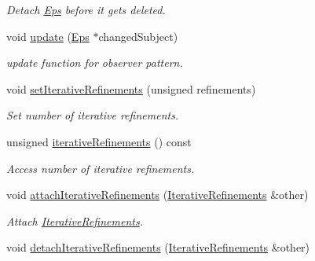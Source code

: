 \begin{DoxyCompactItemize}
\begin{DoxyCompactList}\small\item\em Detach \hyperlink{classSpacy_1_1Mixin_1_1Eps}{Eps} before it gets deleted. \end{DoxyCompactList}\item 
\hypertarget{classSpacy_1_1Mixin_1_1Eps_a151216968daef3da5f5cdc0b957ce01b}{}void \hyperlink{classSpacy_1_1Mixin_1_1Eps_a151216968daef3da5f5cdc0b957ce01b}{update} (\hyperlink{classSpacy_1_1Mixin_1_1Eps_a51dbe0b9cc950e0f3dfd34a481f08ae4_a51dbe0b9cc950e0f3dfd34a481f08ae4}{Eps} $\ast$changed\+Subject)\label{classSpacy_1_1Mixin_1_1Eps_a151216968daef3da5f5cdc0b957ce01b}

\begin{DoxyCompactList}\small\item\em update function for observer pattern. \end{DoxyCompactList}\item 
void \hyperlink{classSpacy_1_1Mixin_1_1IterativeRefinements_afd8815d6932a99b1700f54162d9f633e_afd8815d6932a99b1700f54162d9f633e}{set\+Iterative\+Refinements} (unsigned refinements)
\begin{DoxyCompactList}\small\item\em Set number of iterative refinements. \end{DoxyCompactList}\item 
unsigned \hyperlink{classSpacy_1_1Mixin_1_1IterativeRefinements_a560cd9428928c941765b71dd7c51ae3b_a560cd9428928c941765b71dd7c51ae3b}{iterative\+Refinements} () const 
\begin{DoxyCompactList}\small\item\em Access number of iterative refinements. \end{DoxyCompactList}\item 
void \hyperlink{classSpacy_1_1Mixin_1_1IterativeRefinements_ad2d1f161aa254d7511df897556e7613e_ad2d1f161aa254d7511df897556e7613e}{attach\+Iterative\+Refinements} (\hyperlink{classSpacy_1_1Mixin_1_1IterativeRefinements_a0cdc2228af8fe052680d24fc4bb7ed6a_a0cdc2228af8fe052680d24fc4bb7ed6a}{Iterative\+Refinements} \&other)
\begin{DoxyCompactList}\small\item\em Attach \hyperlink{classSpacy_1_1Mixin_1_1IterativeRefinements}{Iterative\+Refinements}. \end{DoxyCompactList}\item 
\hypertarget{classSpacy_1_1Mixin_1_1IterativeRefinements_aa3b4275d845ef9dabb3f5fefbed43112}{}void \hyperlink{classSpacy_1_1Mixin_1_1IterativeRefinements_aa3b4275d845ef9dabb3f5fefbed43112}{detach\+Iterative\+Refinements} (\hyperlink{classSpacy_1_1Mixin_1_1IterativeRefinements_a0cdc2228af8fe052680d24fc4bb7ed6a_a0cdc2228af8fe052680d24fc4bb7ed6a}{Iterative\+Refinements} \&other)\label{classSpacy_1_1Mixin_1_1IterativeRefinements_aa3b4275d845ef9dabb3f5fefbed43112}


\end{DoxyCompactItemize}
